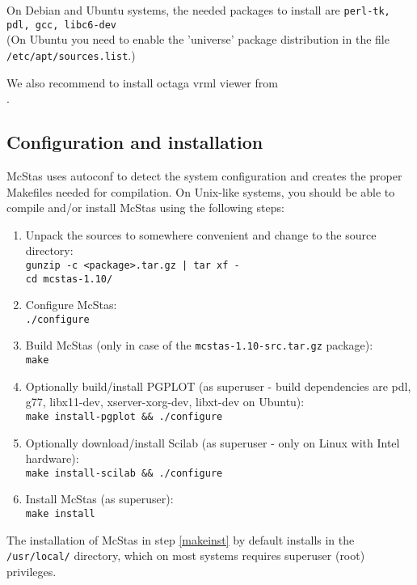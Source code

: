 \noindent On Debian and Ubuntu systems, the
needed packages to install are \texttt{perl-tk, pdl, gcc,
  libc6-dev} \\(On Ubuntu you need to enable the 'universe' package
distribution in the file \\\verb+/etc/apt/sources.list+.)

\noindent We also recommend to install octaga vrml viewer from
\\.

\subsection{Configuration and installation}
McStas uses autoconf to detect the system configuration and creates the
proper Makefiles needed for compilation. On Unix-like systems, you
should be able to compile and/or install McStas using the following steps:
\begin{enumerate}
\item{Unpack the sources to somewhere convenient and change to the
    source directory:\\
  \texttt{gunzip -c <package>.tar.gz | tar xf -}\\
  \texttt{cd mcstas-1.10/}}
\item{Configure McStas:\\
  \texttt{./configure}}
\item{Build McStas (only in case of the \verb+mcstas-1.10-src.tar.gz+ package):\\
  \texttt{make}}
\item{Optionally build/install PGPLOT (as superuser - build
    dependencies are pdl, g77, libx11-dev, xserver-xorg-dev, libxt-dev
    on Ubuntu):\\
    \texttt{make install-pgplot \&\& ./configure}
    \label{pg_install}}
\item{Optionally download/install Scilab (as superuser - only on Linux
    with Intel hardware):\\
    \texttt{make install-scilab \&\& ./configure}
    \label{sci_install}}
\item{Install McStas (as superuser):\\
  \texttt{make install}
\label{makeinst}}
\end{enumerate}



\noindent The installation of McStas in step \ref{makeinst} by default installs in the
\texttt{/usr/local/} directory, which on most systems requires superuser (root)
privileges.

